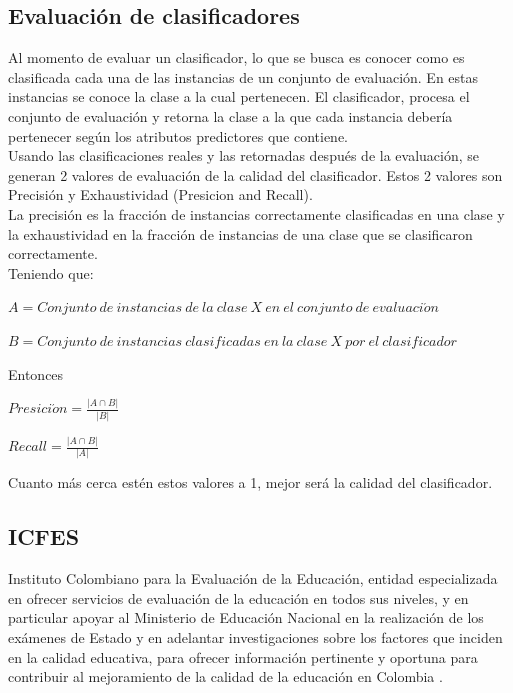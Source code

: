 \subsection{Evaluación de clasificadores}
Al momento de evaluar un clasificador, lo que se busca es conocer como es clasificada cada una de las instancias de un conjunto de evaluación. En estas instancias se conoce la clase a la cual pertenecen. El clasificador, procesa el conjunto de evaluación y retorna la clase a la que cada instancia debería pertenecer según los atributos predictores que contiene.\\
Usando las clasificaciones reales y las retornadas después de la evaluación, se generan 2 valores de evaluación de la calidad del clasificador. Estos 2 valores son Precisión y Exhaustividad (Presicion and Recall).\\
La precisión es la fracción de instancias correctamente clasificadas en una clase y la exhaustividad en la fracción de instancias de una clase que se clasificaron correctamente. \cite{key-280}\\
Teniendo que:
\begin{center}
$A=Conjunto\ de\  instancias\  de\  la\  clase\  X\  en\  el\  conjunto\  de\  evaluaci\acute{o}n$

$B=Conjunto\  de\  instancias\  clasificadas\  en\  la\  clase\  X\  por\  el\  clasificador$
\end{center}
Entonces
\begin{center}
$Presici\acute{o}n=\frac{|A\cap B|}{|B|}$

$Recall=\frac{|A\cap B|}{|A|}$
\end{center}
Cuanto más cerca estén estos valores a 1, mejor será la calidad del clasificador.
\subsection{ICFES}
Instituto Colombiano para la Evaluación de la Educación, entidad especializada en ofrecer servicios de evaluación de la educación en todos sus niveles, y en particular apoyar al Ministerio de Educación Nacional en la realización de los exámenes de Estado y en adelantar investigaciones sobre los factores que inciden en la calidad educativa, para ofrecer información pertinente y oportuna para contribuir al mejoramiento de la calidad de la educación en Colombia \cite{key-80}.
